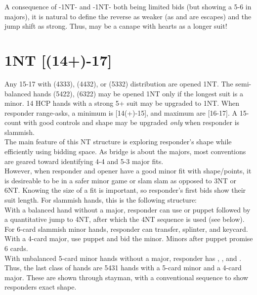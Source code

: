 \documentclass[12pt]{report}
\newcommand{\n}{\\}
\newcommand{\bidsection}[2]{\section{\texorpdfstring{#1}{#2}}}
\begin{document}
    A consequence of -1NT- and -1NT- both being limited bids (but showing a 5-6 in majors), it is natural to define the reverse as weaker (as  and  are escapes) and the jump shift as strong.  Thus,  may be a canape with hearts as a longer suit!
        

\bidsection{1NT [(14+)-17]}{1NT [(14+)-17]} \label{2:7}

    Any 15-17 with (4333), (4432), or (5332) distribution are opened 1NT.  The semi-balanced hands (5422), (6322) may be opened 1NT only if the longest suit is a minor. 14 HCP hands with a strong 5+ suit may be upgraded to 1NT.  When responder range-asks, a minimum is [14(+)-15], and maximum are [16-17].  A 15-count with good controls and shape may be upgraded \textit{only} when responder is slammish.
    \\

    The main feature of this NT structure is exploring responder's shape while efficiently using bidding space.  As bridge is about the majors, most conventions are geared toward identifying 4-4 and 5-3 major fits.\n

    However, when responder and opener have a good minor fit with shape/points, it is desireable to be in a safer minor game or slam slam as opposed to 3NT or 6NT.  Knowing the size of a fit is important, so responder's first bids show their suit length. For slammish hands, this is the following structure: \n
    
    With a balanced hand without a major, responder can use  or  puppet followed by a quantitative jump to 4NT, after which the 4NT sequence is used (see below). \n
    
    For 6-card slammish minor hands, responder can transfer, splinter, and keycard.  With a 4-card major, use puppet and bid the minor.  Minors after puppet promise 6 cards. \n

    With unbalanced 5-card minor hands without a major, responder has , , and .  Thus, the last class of hands are 5431 hands with a 5-card minor and a 4-card major.  These are shown through  stayman, with a conventional sequence to show responders exact shape. \n\n
\end{document}
